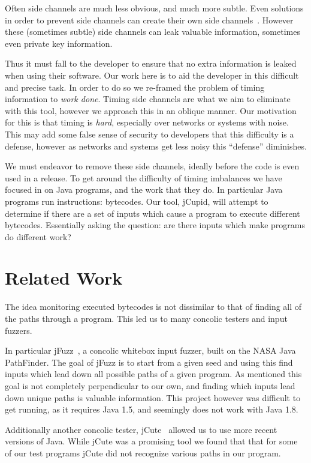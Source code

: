 \documentclass[letterpaper,twocolumn,10pt]{article}
\begin{document}
Often side channels are much less obvious, and much more subtle. Even solutions in order to prevent side channels can create their own side channels~\cite{al2013lucky}. However these (sometimes subtle) side channels can leak valuable information, sometimes even private key information.

Thus it must fall to the developer to ensure that no extra information is leaked when using their software. Our work here is to aid the developer in this difficult and precise task. In order to do so we re-framed the problem of timing information to \emph{work done}. Timing side channels are what we aim to eliminate with this tool, however we approach this in an oblique manner. Our motivation for this is that timing is \emph{hard}, especially over networks or systems with noise. This may add some false sense of security to developers that this difficulty is a defense, however as networks and systems get less noisy this ``defense'' diminishes.

We must endeavor to remove these side channels, ideally before the code is even used in a release. To get around the difficulty of timing imbalances we have focused in on Java programs, and the work that they do. In particular Java programs run instructions: bytecodes. Our tool, jCupid, will attempt to determine if there are a set of inputs which cause a program to execute different bytecodes. Essentially asking the question: are there inputs which make programs do different work?

\section{Related Work}

The idea monitoring executed bytecodes is not dissimilar to that of finding all of the paths through a program. This led us to many concolic testers and input fuzzers. 

In particular jFuzz~\cite{jayaraman2009jfuzz}, a concolic whitebox input fuzzer, built on the NASA Java PathFinder. The goal of jFuzz is to start from a given seed and using this find inputs which lead down all possible paths of a given program. As mentioned this goal is not completely perpendicular to our own, and finding which inputs lead down unique paths is valuable information. This project however was difficult to get running, as it requires Java 1.5, and seemingly does not work with Java 1.8.

Additionally another concolic tester, jCute~\cite{conf/cav/SenA06} allowed us to use more recent versions of Java. While jCute was a promising tool we found that that for some of our test programs jCute did not recognize various paths in our program.
\end{document}
